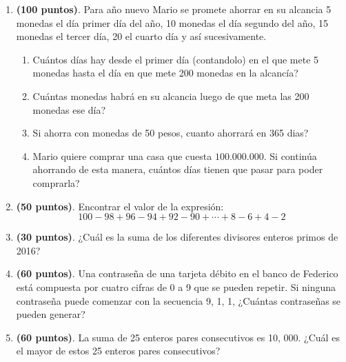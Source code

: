 \begin{enumerate}
	\item \textbf{(100 puntos)}. Para año nuevo Mario se promete ahorrar en su alcancia 5 monedas el día primer día del año, 10 monedas el día segundo del año, 15 monedas el tercer día, 20 el cuarto día y así sucesivamente.
	\begin{enumerate}[label=\Alph*)]
		\item Cuántos días hay desde el primer día (contandolo) en el que mete 5 monedas hasta el día en que mete 200 monedas en la alcancía?
		
		\item Cuántas monedas habrá en su alcancia luego de que meta las 200 monedas ese día? 
		
		\item Si ahorra con monedas de 50 pesos, cuanto ahorrará en 365 dias?
		
		\item Mario quiere comprar una casa que cuesta $100.000.000$. Si continúa ahorrando de esta manera, cuántos días tienen que pasar para poder comprarla?
	\end{enumerate}
			

	\item \textbf{(50 puntos)}. Encontrar el valor de la expresión:
	\[100-98+96-94+92-90+\cdots +8-6+4-2\]
	
				
	\item \textbf{(30 puntos)}.  ¿Cuál es la suma de los diferentes divisores enteros primos de
	2016?
			
		
	\item \textbf{(60 puntos)}. Una contraseña de una tarjeta débito en el banco de Federico
	está compuesta por cuatro cifras de 0 a 9 que se pueden repetir.	Si ninguna contraseña puede comenzar con la secuencia 9, 1, 1,
	¿Cuántas contraseñas se pueden generar?
	
	\item \textbf{(60 puntos)}. La suma de 25 enteros pares consecutivos es 10, 000. ¿Cuál es
	el mayor de estos 25 enteros pares consecutivos?
	
\end{enumerate}





